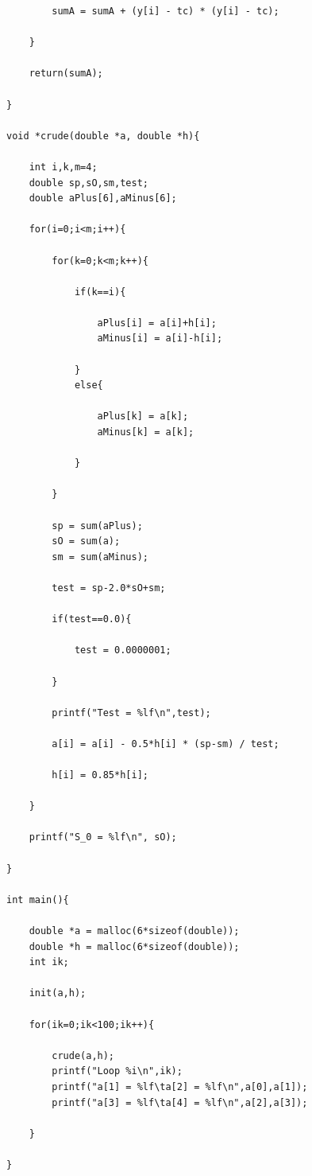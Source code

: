 \documentclass[12pt]{article}
\begin{document}
\begin{verbatim}
		sumA = sumA + (y[i] - tc) * (y[i] - tc);

	}

	return(sumA);

}

void *crude(double *a, double *h){

	int i,k,m=4;
	double sp,sO,sm,test;
	double aPlus[6],aMinus[6];

	for(i=0;i<m;i++){

		for(k=0;k<m;k++){

			if(k==i){

				aPlus[i] = a[i]+h[i];
				aMinus[i] = a[i]-h[i];

			}
			else{

				aPlus[k] = a[k];
				aMinus[k] = a[k];

			}

		}

		sp = sum(aPlus);
		sO = sum(a);
		sm = sum(aMinus);

		test = sp-2.0*sO+sm;

		if(test==0.0){

			test = 0.0000001;

		}

		printf("Test = %lf\n",test);

		a[i] = a[i] - 0.5*h[i] * (sp-sm) / test;

		h[i] = 0.85*h[i];

	}

	printf("S_0 = %lf\n", sO);

}

int main(){

	double *a = malloc(6*sizeof(double));
	double *h = malloc(6*sizeof(double));
	int ik;

	init(a,h);

	for(ik=0;ik<100;ik++){

		crude(a,h);
		printf("Loop %i\n",ik);
		printf("a[1] = %lf\ta[2] = %lf\n",a[0],a[1]);
		printf("a[3] = %lf\ta[4] = %lf\n",a[2],a[3]);

	}

}
\end{verbatim}
\end{document}
